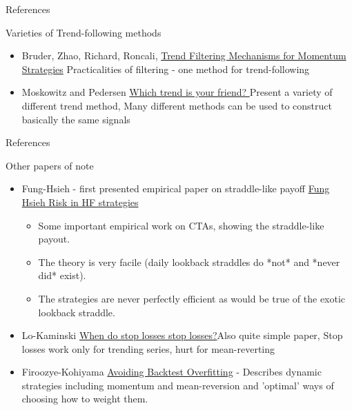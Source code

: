 \begin{frame}{References}
\begin{alertblock}{Varieties of Trend-following methods}
    \begin{itemize}

    \item Bruder, Zhao, Richard, Roncali,  \href{http://www.thierry-roncalli.com/download/lwp-tf.pdf }{Trend Filtering Mechanisms for Momentum Strategies} Practicalities of filtering - one method for trend-following 

    \item Moskowitz and Pedersen \href{http://papers.ssrn.com/sol3/papers.cfm?abstract_id=2603731}{Which trend is your friend? } Present a variety of different trend method, Many different methods can be used to construct basically the same signals


    \end{itemize}
\end{alertblock}
\end{frame}


\begin{frame}{References}
\begin{alertblock}{Other papers of note}
    \begin{itemize}
    \item Fung-Hsieh - first presented empirical paper on  straddle-like payoff   \href{https://www.trendfollowing.com/whitepaper/hsieh_fung_final_paper.pdf}{Fung Hsieh Risk in HF strategies}
    \begin{itemize}
    \item Some important empirical work on CTAs, showing the straddle-like payout.
    \item The theory is very facile (daily lookback straddles do *not* and *never did* exist). 
    \item The strategies are never perfectly efficient as would be true of the exotic lookback straddle.
    \end{itemize}
     \item Lo-Kaminski \href{http://papers.ssrn.com/sol3/papers.cfm?abstract_id=968338}{When do stop losses stop losses?}Also quite simple paper, Stop losses work only for trending series, hurt for mean-reverting

    \item Firoozye-Kohiyama \href{https://arxiv.org/abs/1905.05023}{Avoiding Backtest Overfitting} - Describes dynamic strategies including momentum and mean-reversion and 'optimal' ways of choosing how to weight them. 
    
    \end{itemize}
\end{alertblock}
\end{frame}


